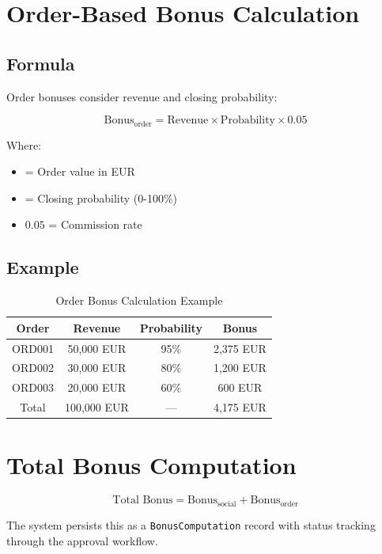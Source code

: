 \documentclass[11pt,a4paper,oneside,openany]{book}
\newcommand{\code}[1]{\texttt{\small #1}}
\begin{document}
\section{Order-Based Bonus Calculation}

\subsection{Formula}

Order bonuses consider revenue and closing probability:

\[
\text{Bonus}_{\text{order}} = \text{Revenue} \times \text{Probability} \times 0.05
\]

Where:
\begin{itemize}
    \item {} = Order value in EUR
    \item {} = Closing probability (0-100\%)
    \item $0.05$ = Commission rate
\end{itemize}

\subsection{Example}

\begin{table}[H]
\centering
\begin{tabular}{|c|c|c|c|}
\hline
\textbf{Order} & \textbf{Revenue} & \textbf{Probability} & \textbf{Bonus} \\
\hline
ORD001 & 50,000 EUR & 95\% & 2,375 EUR \\
ORD002 & 30,000 EUR & 80\% & 1,200 EUR \\
ORD003 & 20,000 EUR & 60\% & 600 EUR \\
\hline
Total & 100,000 EUR & --- & 4,175 EUR \\
\hline
\end{tabular}
\caption{Order Bonus Calculation Example}
\end{table}

\section{Total Bonus Computation}

\[
\text{Total Bonus} = \text{Bonus}_{\text{social}} + \text{Bonus}_{\text{order}}
\]

The system persists this as a \code{BonusComputation} record with status tracking through the approval workflow.
\end{document}
